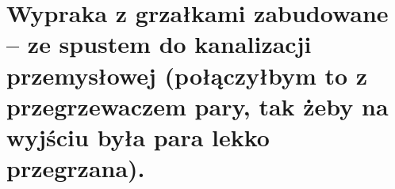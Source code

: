 \section{Wypraka z grzałkami zabudowane – ze spustem do kanalizacji przemysłowej
(połączyłbym to z przegrzewaczem pary, tak żeby na wyjściu była para
lekko przegrzana).}